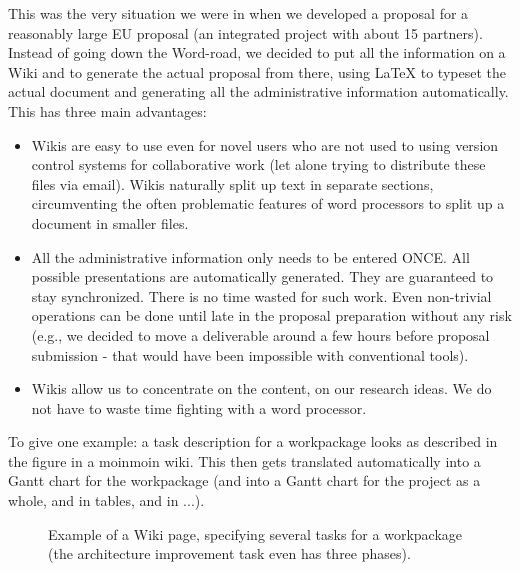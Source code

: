 \documentclass[a4paper,10pt,english]{sphinxmanual}
\begin{document}
This was the very situation we were in when we developed a proposal for a reasonably large EU proposal (an integrated project with about 15 partners). Instead of going down the Word-road, we decided to put all the information on a Wiki and to generate the actual proposal from there, using LaTeX to typeset the actual document and generating all the administrative information automatically. This has three main advantages:
\begin{itemize}
\item {} 
Wikis are easy to use even for novel users who are not used to using version control systems for collaborative work (let alone trying to distribute these files via email). Wikis naturally split up text in separate sections, circumventing the often problematic features of word processors to split up a document in smaller files.

\item {} 
All the administrative information only needs to be entered ONCE. All possible presentations are automatically generated. They are guaranteed to stay synchronized. There is no time wasted for such work. Even non-trivial operations can be done until late in the proposal preparation without any risk (e.g., we decided to move a deliverable around a few hours before proposal submission - that would have been impossible with conventional tools).

\item {} 
Wikis allow us to concentrate on the content, on our research ideas. We do not have to waste time fighting with a word processor.

\end{itemize}

To give one example: a task description for a workpackage looks as described in the figure in a moinmoin wiki. This then gets translated automatically into a Gantt chart for the workpackage (and into a Gantt chart for the project as a whole, and in tables, and in ...).
\begin{figure}[htbp]
\centering
\capstart

\caption{Example of a Wiki page, specifying several tasks for a workpackage (the architecture improvement task even has three phases).}\end{figure}
\end{document}

